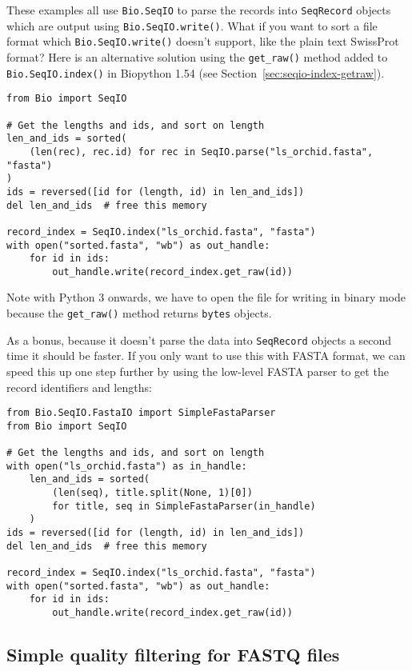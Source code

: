 These examples all use \verb|Bio.SeqIO| to parse the records into
\verb|SeqRecord| objects which are output using \verb|Bio.SeqIO.write()|.
What if you want to sort a file format which \verb|Bio.SeqIO.write()| doesn't
support, like the plain text SwissProt format? Here is an alternative
solution using the \verb|get_raw()| method added to \verb|Bio.SeqIO.index()|
in Biopython 1.54 (see Section~\ref{sec:seqio-index-getraw}).

\begin{verbatim}
from Bio import SeqIO

# Get the lengths and ids, and sort on length
len_and_ids = sorted(
    (len(rec), rec.id) for rec in SeqIO.parse("ls_orchid.fasta", "fasta")
)
ids = reversed([id for (length, id) in len_and_ids])
del len_and_ids  # free this memory

record_index = SeqIO.index("ls_orchid.fasta", "fasta")
with open("sorted.fasta", "wb") as out_handle:
    for id in ids:
        out_handle.write(record_index.get_raw(id))
\end{verbatim}

Note with Python 3 onwards, we have to open the file for writing in
binary mode because the \verb|get_raw()| method returns \verb|bytes| objects.

As a bonus, because it doesn't parse the data into \verb|SeqRecord| objects
a second time it should be faster. If you only want to use this with FASTA
format, we can speed this up one step further by using the low-level FASTA
parser to get the record identifiers and lengths:

\begin{verbatim}
from Bio.SeqIO.FastaIO import SimpleFastaParser
from Bio import SeqIO

# Get the lengths and ids, and sort on length
with open("ls_orchid.fasta") as in_handle:
    len_and_ids = sorted(
        (len(seq), title.split(None, 1)[0])
        for title, seq in SimpleFastaParser(in_handle)
    )
ids = reversed([id for (length, id) in len_and_ids])
del len_and_ids  # free this memory

record_index = SeqIO.index("ls_orchid.fasta", "fasta")
with open("sorted.fasta", "wb") as out_handle:
    for id in ids:
        out_handle.write(record_index.get_raw(id))
\end{verbatim}

\subsection{Simple quality filtering for FASTQ files}
\label{sec:FASTQ-filtering-example}

